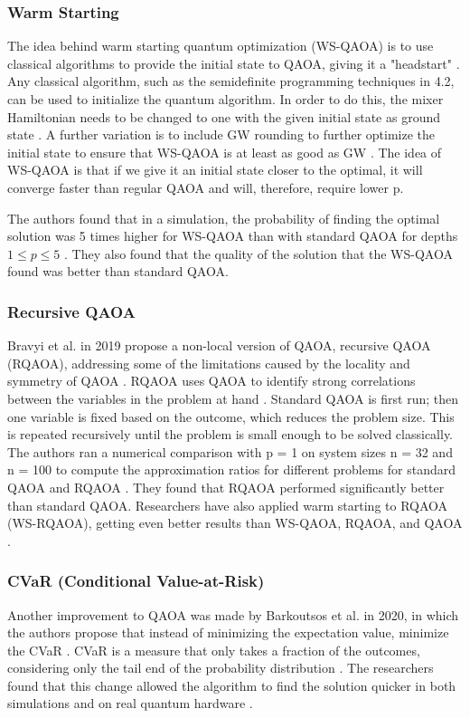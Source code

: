 \subsubsection{Warm Starting}
The idea behind warm starting quantum optimization (WS-QAOA) is to use classical algorithms to provide the initial state to QAOA, giving it a "headstart" \cite{29egger2020warmstarting}. Any classical algorithm, such as the semidefinite programming techniques in 4.2, can be used to initialize the quantum algorithm. In order to do this, the mixer Hamiltonian needs to be changed to one with the given initial state as ground state \cite{29egger2020warmstarting}. A further variation is to include GW rounding to further optimize the initial state to ensure that WS-QAOA is at least as good as GW \cite{29egger2020warmstarting}. The idea of WS-QAOA is that if we give it an initial state closer to the optimal, it will converge faster than regular QAOA and will, therefore, require lower p.

The authors found that in a simulation, the probability of finding the optimal solution was 5 times higher for WS-QAOA than with standard QAOA for depths $1 \leq p \leq 5$ \cite{29egger2020warmstarting}. They also found that the quality of the solution that the WS-QAOA found was better than standard QAOA.

\subsubsection{Recursive QAOA}
Bravyi et al. in 2019 propose a non-local version of QAOA, recursive QAOA (RQAOA), addressing some of the limitations caused by the locality and symmetry of QAOA \cite{31bravyi2018obstacles}. RQAOA uses QAOA to identify strong correlations between the variables in the problem at hand \cite{31bravyi2018obstacles}. Standard QAOA is first run; then one variable is fixed based on the outcome, which reduces the problem size. This is repeated recursively until the problem is small enough to be solved classically. The authors ran a numerical comparison with p = 1 on system sizes n = 32 and n = 100 to compute the approximation ratios for different problems for standard QAOA and RQAOA \cite{31bravyi2018obstacles}. They found that RQAOA performed significantly better than standard QAOA. Researchers have also applied warm starting to RQAOA (WS-RQAOA), getting even better results than WS-QAOA, RQAOA, and QAOA \cite{29egger2020warmstarting}.

\subsubsection{CVaR (Conditional Value-at-Risk)}
Another improvement to QAOA was made by Barkoutsos et al. in 2020, in which the authors propose that instead of minimizing the expectation value, minimize the CVaR \cite{30barkoutsos2020}. CVaR is a measure that only takes a fraction of the outcomes, considering only the tail end of the probability distribution \cite{30barkoutsos2020}. The researchers found that this change allowed the algorithm to find the solution quicker in both simulations and on real quantum hardware \cite{30barkoutsos2020}.

